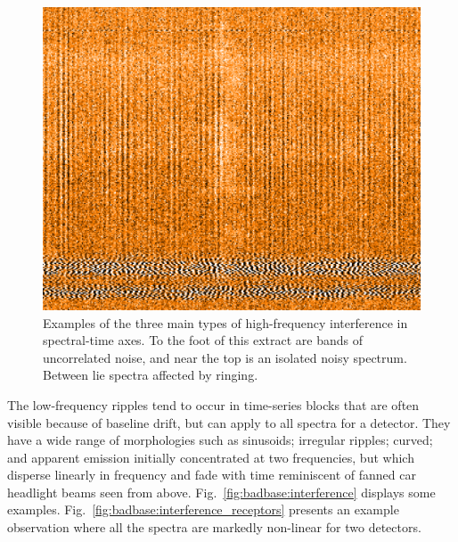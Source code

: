 \documentclass[useAMS,usenatbib]{mn2e}
\begin{document}
\begin{figure}
\includegraphics[width=\columnwidth]{high_freq_three_types.png}
\caption{Examples of the three main types of high-frequency
  interference in spectral-time axes.  To the foot of this extract
  are bands of uncorrelated noise, and near the top is an isolated
  noisy spectrum.  Between lie spectra affected by ringing.}
\label{fig:badbase:highfreq}
\end{figure}

The low-frequency ripples tend to occur in time-series blocks that are
often visible because of baseline drift, but can apply to all spectra
for a detector.  They have a wide range of morphologies such as
sinusoids; irregular ripples; curved; and apparent emission initially
concentrated at two frequencies, but which disperse linearly in
frequency and fade with time reminiscent of fanned car headlight
beams seen from above.
Fig.~\ref{fig:badbase:interference} displays some examples.
Fig.~\ref{fig:badbase:interference_receptors} presents an example
observation where all the spectra are markedly non-linear for two
detectors.
\end{document}
